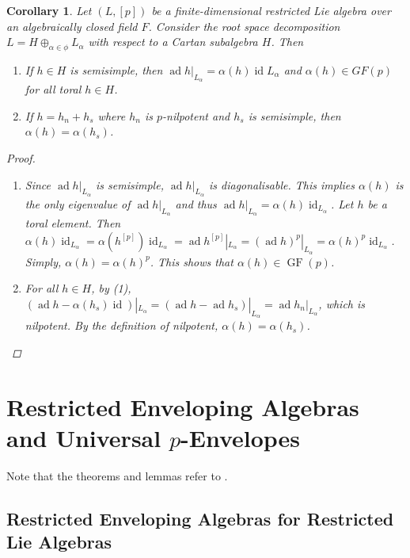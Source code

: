 \documentclass[12pt,MSc]{muthesis_2023}
\theoremstyle{plain}%
\newtheorem{Corollary}[FactCounter]{Corollary} %
\theoremstyle{definition}
\theoremstyle{remark}
\DeclareMathOperator{\ad}{ad}
\DeclareMathOperator{\id}{id}
\DeclareMathOperator{\GF}{GF}
\begin{document}
\begin{Corollary}
Let $(L, [p])$ be a finite-dimensional restricted Lie algebra over an algebraically closed field $F$. Consider the root space decomposition $L=H \oplus_{\alpha\in \phi} L_{\alpha}$ with respect to a Cartan subalgebra $H$. Then

\begin{enumerate}
\item[(1)]
If $h\in H$ is semisimple, then $\ad h\vert_{L_{\alpha}}=\alpha(h)\id L_{\alpha}$ and $\alpha(h)\in GF(p)$ for all toral $h\in H$.

\item[(2)]
If $h=h_n+h_s$ where $h_n$ is $p$-nilpotent and $h_s$ is semisimple, then $\alpha(h)=\alpha(h_s)$.
\end{enumerate}

\begin{proof}
\begin{enumerate}
\item[(1)]
Since $\ad h|_{L_{\alpha}}$ is semisimple, $\ad h|_{L_{\alpha}}$ is diagonalisable. This implies $\alpha(h)$ is the only eigenvalue of $\ad h|_{L_{\alpha}}$ and thus $\ad h|_{L_{\alpha}} = \alpha(h)\id_{L_{\alpha}}$. Let $h$ be a toral element. Then $\alpha(h)\id_{L_{\alpha}}=\alpha(h^{[p]})\id_{L_{\alpha}}=\ad h^{[p]}|_{L_{\alpha}}=(\ad h)^p|_{L_{\alpha}}=\alpha(h)^p\id_{L_{\alpha}}$. Simply, $\alpha(h)=\alpha(h)^p$. This shows that $\alpha(h)\in \GF(p)$.
\item[(2)]
For all $h\in H$, by (1), $(\ad h - \alpha(h_s)\id)|_{L_{\alpha}}=(\ad h-\ad h_s)|_{L_{\alpha}}=\ad h_n|_{L_{\alpha}}$, which is nilpotent. By the definition of nilpotent, $\alpha(h)=\alpha(h_s)$.
\end{enumerate}
\end{proof}
\end{Corollary}



\chapter{Restricted Enveloping Algebras and Universal $p$-Envelopes}

Note that the theorems and lemmas refer to  \cite[Section 5, Chapter 2]{SF}.
\section{Restricted Enveloping Algebras for Restricted Lie Algebras}
\end{document}
